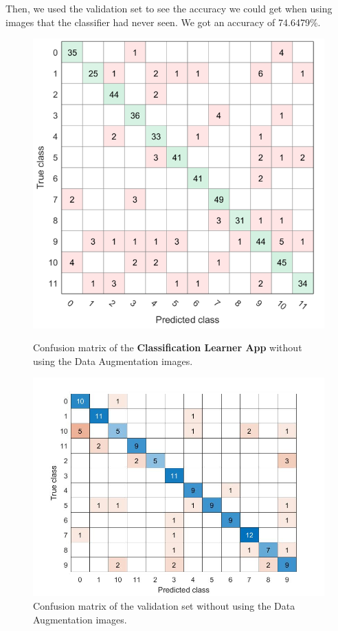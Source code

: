 \documentclass[11]{article}
\begin{document}
Then, we used the validation set to see the accuracy we could get when using images that the classifier had never seen. We got an accuracy of 74.6479\%.

\begin{figure}[H]
\centering
\hspace{-0.5cm}
\begin{minipage}{0.4\linewidth}
  \centering
  \includegraphics[scale=0.45]{images/firstOne.PNG}
  \caption{Confusion matrix of the \textbf{Classification Learner App} without using the Data Augmentation images.}
  \label{plot:exe-gauss}
\end{minipage}%
\hspace{1.5cm}
\begin{minipage}{0.4\linewidth}
  \centering
  \includegraphics[scale=0.25]{images/firstmatrix.jpg}
  \caption{Confusion matrix of the validation set without using the Data Augmentation images.}
    \label{plot:speed-gauss}
\end{minipage}
\end{figure}
\end{document}
